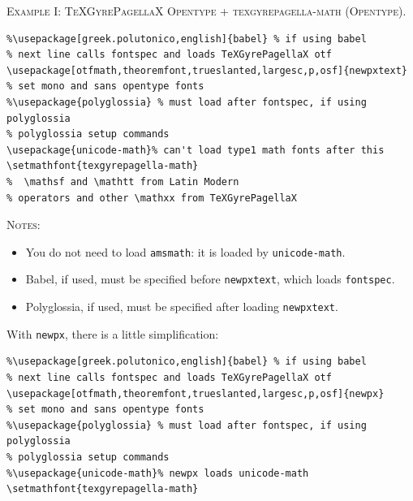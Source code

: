 \documentclass[11pt]{article}
\theoremstyle{oldplain}
\theoremstyle{plain}
\begin{document}
\textsc{Example I: TeXGyrePagellaX Opentype + texgyrepagella-math (Opentype).}
\begin{verbatim}
%\usepackage[greek.polutonico,english]{babel} % if using babel
% next line calls fontspec and loads TeXGyrePagellaX otf
\usepackage[otfmath,theoremfont,trueslanted,largesc,p,osf]{newpxtext}
% set mono and sans opentype fonts
%\usepackage{polyglossia} % must load after fontspec, if using polyglossia
% polyglossia setup commands
\usepackage{unicode-math}% can't load type1 math fonts after this
\setmathfont{texgyrepagella-math}
%  \mathsf and \mathtt from Latin Modern
% operators and other \mathxx from TeXGyrePagellaX
\end{verbatim}
\textsc{Notes:}
\begin{itemize}
\item
You do not need to load {\tt amsmath}: it is loaded by {\tt unicode-math}.
\item Babel, if used, must be specified before {\tt newpxtext}, which loads {\tt fontspec}.
\item Polyglossia, if used, must be specified after loading {\tt newpxtext}.
\end{itemize}
With {\tt newpx}, there is a little simplification:
\begin{verbatim}
%\usepackage[greek.polutonico,english]{babel} % if using babel
% next line calls fontspec and loads TeXGyrePagellaX otf
\usepackage[otfmath,theoremfont,trueslanted,largesc,p,osf]{newpx}
% set mono and sans opentype fonts
%\usepackage{polyglossia} % must load after fontspec, if using polyglossia
% polyglossia setup commands
%\usepackage{unicode-math}% newpx loads unicode-math
\setmathfont{texgyrepagella-math}
\end{verbatim}

\end{document}
